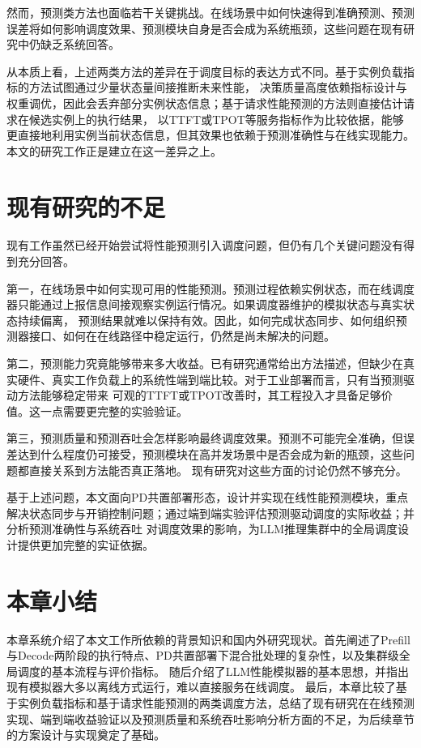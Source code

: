 然而，预测类方法也面临若干关键挑战。在线场景中如何快速得到准确预测、预测误差将如何影响调度效果、预测模块自身是否会成为系统瓶颈，这些问题在现有研究中仍缺乏系统回答。

从本质上看，上述两类方法的差异在于调度目标的表达方式不同。基于实例负载指标的方法试图通过少量状态量间接推断未来性能，
决策质量高度依赖指标设计与权重调优，因此会丢弃部分实例状态信息；基于请求性能预测的方法则直接估计请求在候选实例上的执行结果，
以TTFT或TPOT等服务指标作为比较依据，能够更直接地利用实例当前状态信息，但其效果也依赖于预测准确性与在线实现能力。本文的研究工作正是建立在这一差异之上。

\section{现有研究的不足}
现有工作虽然已经开始尝试将性能预测引入调度问题，但仍有几个关键问题没有得到充分回答。

第一，在线场景中如何实现可用的性能预测。预测过程依赖实例状态，而在线调度器只能通过上报信息间接观察实例运行情况。如果调度器维护的模拟状态与真实状态持续偏离，
预测结果就难以保持有效。因此，如何完成状态同步、如何组织预测器接口、如何在在线路径中稳定运行，仍然是尚未解决的问题。

第二，预测能力究竟能够带来多大收益。已有研究通常给出方法描述，但缺少在真实硬件、真实工作负载上的系统性端到端比较。对于工业部署而言，只有当预测驱动方法能够稳定带来
可观的TTFT或TPOT改善时，其工程投入才具备足够价值。这一点需要更完整的实验验证。

第三，预测质量和预测吞吐会怎样影响最终调度效果。预测不可能完全准确，但误差达到什么程度仍可接受，预测模块在高并发场景中是否会成为新的瓶颈，这些问题都直接关系到方法能否真正落地。
现有研究对这些方面的讨论仍然不够充分。

基于上述问题，本文面向PD共置部署形态，设计并实现在线性能预测模块，重点解决状态同步与开销控制问题；通过端到端实验评估预测驱动调度的实际收益；并分析预测准确性与系统吞吐
对调度效果的影响，为LLM推理集群中的全局调度设计提供更加完整的实证依据。

\section{本章小结}
本章系统介绍了本文工作所依赖的背景知识和国内外研究现状。首先阐述了Prefill与Decode两阶段的执行特点、PD共置部署下混合批处理的复杂性，以及集群级全局调度的基本流程与评价指标。
随后介绍了LLM性能模拟器的基本思想，并指出现有模拟器大多以离线方式运行，难以直接服务在线调度。
最后，本章比较了基于实例负载指标和基于请求性能预测的两类调度方法，总结了现有研究在在线预测实现、端到端收益验证以及预测质量和系统吞吐影响分析方面的不足，为后续章节的方案设计与实现奠定了基础。
